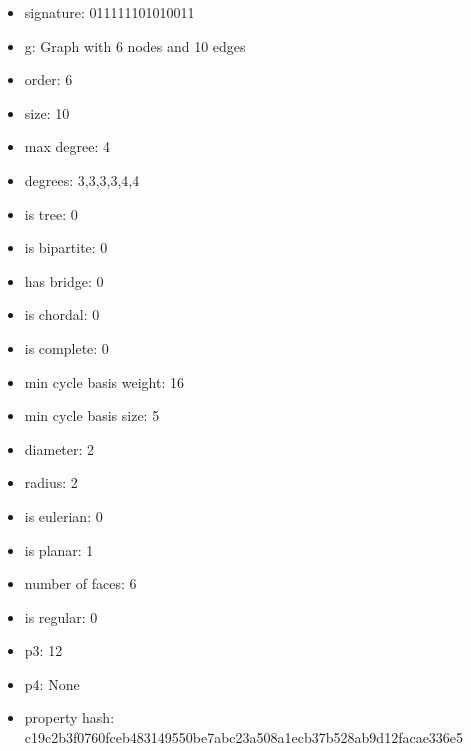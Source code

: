 \begin{itemize}
\item signature: 011111101010011
\item g: Graph with 6 nodes and 10 edges
\item order: 6
\item size: 10
\item max degree: 4
\item degrees: 3,3,3,3,4,4
\item is tree: 0
\item is bipartite: 0
\item has bridge: 0
\item is chordal: 0
\item is complete: 0
\item min cycle basis weight: 16
\item min cycle basis size: 5
\item diameter: 2
\item radius: 2
\item is eulerian: 0
\item is planar: 1
\item number of faces: 6
\item is regular: 0
\item p3: 12
\item p4: None
\item property hash: c19c2b3f0760fceb483149550be7abc23a508a1ecb37b528ab9d12facae336e5
\end{itemize}
\newpage
\begin{figure}
\end{figure}
